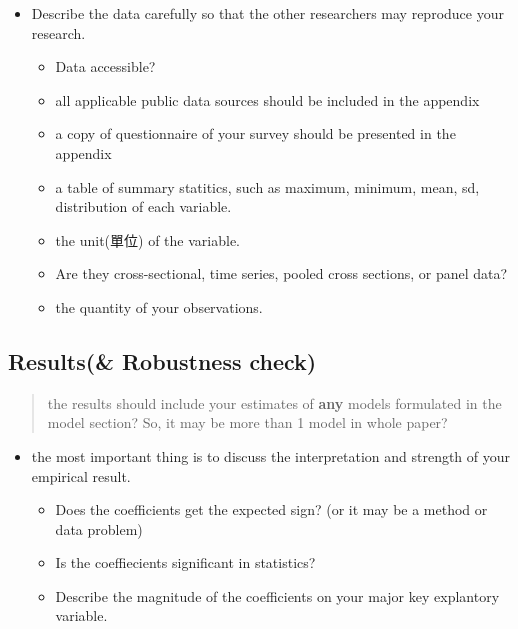 \documentclass[]{book}
\begin{document}
\begin{itemize}
\item
  Describe the data carefully so that the other researchers may reproduce your research.

  \begin{itemize}
  \item
    Data accessible?
  \item
    all applicable public data sources should be included in the appendix
  \item
    a copy of questionnaire of your survey should be presented in the appendix
  \item
    a table of summary statitics, such as maximum, minimum, mean, sd, distribution of each variable.
  \item
    the unit(單位) of the variable.
  \item
    Are they cross-sectional, time series, pooled cross sections, or panel data?
  \item
    the quantity of your observations.
  \end{itemize}
\end{itemize}

\hypertarget{results-robustness-check}{%
\subsection{Results(\& Robustness check)}\label{results-robustness-check}}

\begin{quote}
the results should include your estimates of \textbf{any} models formulated in the model section? So, it may be more than 1 model in whole paper?
\end{quote}

\begin{itemize}
\item
  the most important thing is to discuss the interpretation and strength of your empirical result.

  \begin{itemize}
  \item
    Does the coefficients get the expected sign? (or it may be a method or data problem)
  \item
    Is the coeffiecients significant in statistics?
  \item
    Describe the magnitude of the coefficients on your major key explantory variable.
  \end{itemize}
\end{itemize}
\end{document}
